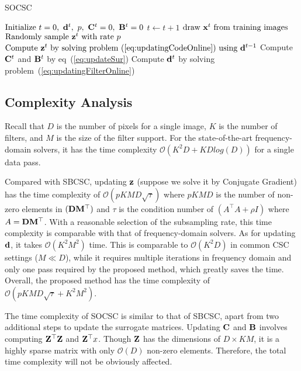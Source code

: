 \begin{algorithm}[H]
\caption{SOCSC} \label{algo:SOCSC}
\begin{algorithmic}[1]
\State $\text{Initialize} ~ t=0, ~\filter^t, ~p, ~\surC^t = 0, ~\surB^t = 0$
    \State $t \gets t+1$
    \State $ \text{draw } \signal^t \text{ from training images} $
    \State $ \text{Randomly sample }\code^t \text{ with rate } p $
    \State $ \text{Compute } \code^t \text{ by solving problem~(\ref{eq:updatingCodeOnline}) using } \filter^{t-1}$
    \State Compute $\surC^t$ and $\surB^t$ by eq~(\ref{eq:updateSur})
    \State Compute $\filter^t$ by solving problem~(\ref{eq:updatingFilterOnline})
\EndWhile
\end{algorithmic}
\end{algorithm}

\subsection{Complexity Analysis}
Recall that $D$ is the number of pixels for a single image, $K$ is the number of filters, and $M$ is the size of the filter support. For the state-of-the-art frequency-domain solvers, it has the time complexity $\mathcal{O}(K^2D + KDlog(D))$ for a single data pass. 

Compared with SBCSC, updating $\code$ (suppose we solve it by Conjugate Gradient) has the time complexity of $\mathcal{O}(pKMD \sqrt{\tau})$ where $pKMD$ is the number of non-zero elements in $(\Filter \mask^\top)$ and $\tau$ is the condition number of $(A^\top A + \rho I)$ where $A = \Filter \mask^\top$. With a reasonable selection of the subsampling rate, this time complexity is comparable with that of frequency-domain solvers. As for updating $\filter$, it takes $\mathcal{O}(K^2M^2)$ time. This is comparable to $\mathcal{O}(K^2D)$ in common CSC settings ($M \ll D$), while it requires multiple iterations in frequency domain and only one pass required by the proposed method, which greatly saves the time. Overall, the proposed method has the time complexity of $\mathcal{O}(pKMD \sqrt{\tau} + K^2M^2)$.

The time complexity of SOCSC is similar to that of SBCSC, apart from two additional steps to update the surrogate matrices. Updating $\surC$ and $\surB$ involves computing $\Code^\top\Code$ and $\Code^\top x$. Though $\Code$ has the dimensions of $D \times KM$, it is a highly sparse matrix with only $\mathcal{O}(D)$ non-zero elements. Therefore, the total time complexity will not be obviously affected. 